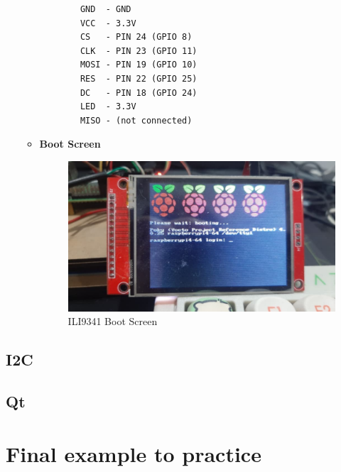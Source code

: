 \documentclass{article}
\begin{document}
\begin{itemize}
\begin{itemize}
        \begin{lstlisting}
        GND  - GND
        VCC  - 3.3V
        CS   - PIN 24 (GPIO 8)
        CLK  - PIN 23 (GPIO 11)
        MOSI - PIN 19 (GPIO 10)
        RES  - PIN 22 (GPIO 25)
        DC   - PIN 18 (GPIO 24)
        LED  - 3.3V
        MISO - (not connected)
        \end{lstlisting}
    
        \item \textbf{Boot Screen}
        \begin{figure}
            \centering
            \includegraphics[width=0.5\linewidth]{boot_screen_ili9341.png}
            \caption{ILI9341 Boot Screen}
            \label{fig:enter-label}
        \end{figure}
    \end{itemize}

\end{itemize}


\subsection{I2C}

\subsection{Qt}

\section{Final example to practice} \label{sec:final-example}




\end{document}
